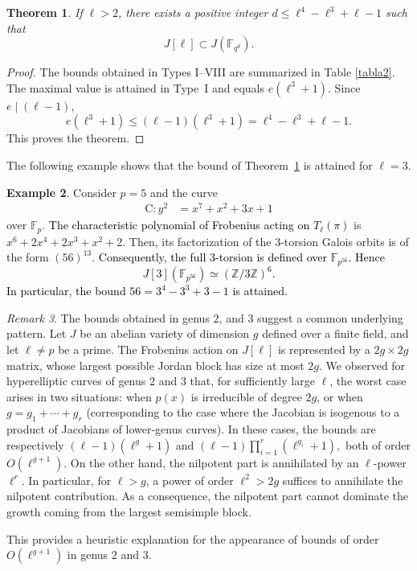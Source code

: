 \documentclass[11pt,a4paper]{article}
\theoremstyle{plain}
\newtheorem{theorem}{Theorem}[section]
\theoremstyle{definition}
\newtheorem{example}[theorem]{Example}
\theoremstyle{remark}
\newtheorem{remark}[theorem]{Remark}
\newcommand{\verde}[1]{\textcolor{black}{#1}}
\newcommand{\azul}[1]{\textcolor{black}{#1}}
\newcommand\C{\mathrm{C}}
\begin{document}
\begin{theorem}\label{teo1}
If $ \ell > 2$, there exists a positive integer \(d \leq \ell^4 - \ell^3 + \ell - 1\) such that
\[
J[\ell] \subset J(\mathbb{F}_{q^d}).
\] 
\end{theorem} 
\begin{proof}
The bounds obtained in Types I--VIII are summarized in Table \ref{tabla2}.
The maximal value is attained in Type~I and equals $e(\ell^3+1)$.
Since $e\mid(\ell-1)$,
\[
e(\ell^3+1)\le (\ell-1)(\ell^3+1)
=\ell^4-\ell^3+\ell-1.
\]
This proves the theorem.
\end{proof}
The following example shows that the bound of Theorem~\ref{teo1} is attained for $\ell=3$.



\begin{example}\label{example2}
Consider $p=5$ and the curve %
\begin{align*}
\C : y^2&= x^7 + x^2 + 3x + 1
\end{align*} 
over $\mathbb{F}_p$. \verde{ The characteristic polynomial of Frobenius acting on $T_{\ell}(\pi)$} is $x^6 + 2x^4 + 2x^3 + x^2 + 2$. Then, its factorization of the 3-torsion Galois orbits
is of the form $(56)^{13}$. 
\azul{Consequently, the full $3$-torsion is defined over
$\mathbb F_{p^{56}}$. Hence
\[
J[3](\mathbb F_{p^{56}})
\simeq (\mathbb Z/3\mathbb Z)^6.
\]
In particular, the bound $56=3^4-3^3+3-1$ is attained.
}
\end{example}


\begin{remark}
    The bounds obtained in genus $2$, and $3$ suggest a common underlying pattern.
Let $J$ be an abelian variety of dimension $g$ defined over a finite field, and let
$\ell \neq p$ be a prime. The Frobenius action on $J[\ell]$ is represented by a $2g \times 2g$ matrix, whose largest possible Jordan block has size at most $2g$.
We observed for hyperelliptic curves of genus $2$ and $3$ that, for sufficiently large  $\ell$, the worst case arises in two situations: when $p(x)$  is irreducible of degree $2g$, or when $g=g_1+\cdots+g_r$ (corresponding to the case where the Jacobian is isogenous to a product of Jacobians of lower-genus curves).
In these cases, the bounds are respectively $(\ell-1)(\ell^g+1)$ and $(\ell-1)\displaystyle\prod_{i=1}^r(\ell^{g_i}+1),$
both of order $O(\ell^{g+1})$.
On the other hand, the nilpotent part is annihilated by an $\ell$-power $\ell^r$. 
In particular, for $\ell > g$, a power of order $\ell^{2}>2g$ suffices to annihilate
the nilpotent contribution. As a consequence, the nilpotent part cannot dominate the
growth coming from the largest semisimple block.

This provides a heuristic explanation for the appearance of bounds of order
$O(\ell^{g+1})$ in genus $2$ and $3$. 

\end{remark}
\end{document}
